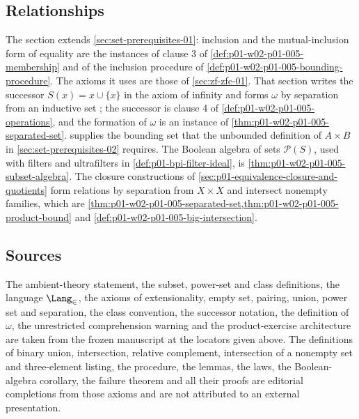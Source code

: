 \subsection{Relationships}
\label{sec:p01-w02-p01-005-relationships}

The section extends \cref{sec:set-prerequisites-01}: inclusion and the
mutual-inclusion form of equality are the instances of clause 3 of
\cref{def:p01-w02-p01-005-membership} and of the inclusion procedure of
\cref{def:p01-w02-p01-005-bounding-procedure}. The axioms it uses are those
of \cref{sec:zf-zfc-01}. That section writes the successor
\(S(x)=x\cup\{x\}\) in the axiom of infinity and forms \(\omega\) by separation
from an inductive set
\cite[ch.~``The Axioms of ZF and ZFC'', definitions ``Infinity'' and ``The set
\(\omega\)'']{FrozenFormalLogicSetOperations}; the successor is clause 4 of
\cref{def:p01-w02-p01-005-operations}, and the formation of \(\omega\) is an
instance of \cref{thm:p01-w02-p01-005-separated-set}.
 supplies the bounding set that the
unbounded definition of \(A\times B\) in \cref{sec:set-prerequisites-02}
requires. The Boolean algebra of sets \(\mathcal P(S)\), used with filters and
ultrafilters in \cref{def:p01-bpi-filter-ideal}, is
\cref{thm:p01-w02-p01-005-subset-algebra}. The closure constructions of
\cref{sec:p01-equivalence-closure-and-quotients} form relations by separation
from \(X\times X\) and intersect nonempty families, which are
\cref{thm:p01-w02-p01-005-separated-set,thm:p01-w02-p01-005-product-bound}
and \cref{def:p01-w02-p01-005-big-intersection}.

\subsection{Sources}
\label{sec:p01-w02-p01-005-sources}

The ambient-theory statement, the subset, power-set and class
definitions, the language \(\Lang_{\in}\), the axioms of extensionality, empty
set, pairing, union, power set and separation, the class convention, the
successor notation, the definition of \(\omega\), the unrestricted
comprehension warning and the product-exercise architecture are taken from the
frozen manuscript \cite{FrozenFormalLogicSetOperations} at the locators given
above. The definitions of binary union, intersection, relative complement,
intersection of a nonempty set and three-element listing, the procedure, the
lemmas, the laws, the Boolean-algebra corollary, the failure theorem and all
their proofs are editorial completions from those axioms and are not
attributed to an external presentation.
